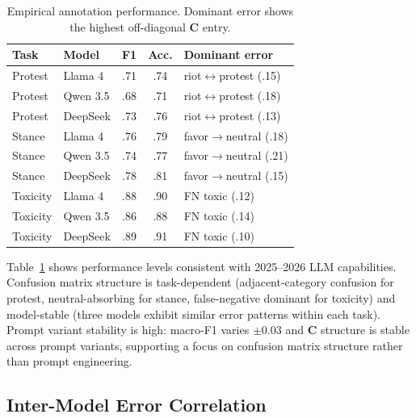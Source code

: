 \documentclass[11pt,letterpaper]{article}
\begin{document}
\begin{table}[t]
\centering
\small
\caption{Empirical annotation performance. Dominant error shows the highest off-diagonal $\mathbf{C}$ entry.}
\label{tab:empirical_performance}
\begin{tabular}{@{}llccl@{}}
\toprule
\textbf{Task} & \textbf{Model} & \textbf{F1} & \textbf{Acc.} & \textbf{Dominant error} \\
\midrule
Protest & Llama 4 & .71 & .74 & riot$\leftrightarrow$protest (.15) \\
Protest & Qwen 3.5 & .68 & .71 & riot$\leftrightarrow$protest (.18) \\
Protest & DeepSeek & .73 & .76 & riot$\leftrightarrow$protest (.13) \\
\midrule
Stance & Llama 4 & .76 & .79 & favor$\to$neutral (.18) \\
Stance & Qwen 3.5 & .74 & .77 & favor$\to$neutral (.21) \\
Stance & DeepSeek & .78 & .81 & favor$\to$neutral (.15) \\
\midrule
Toxicity & Llama 4 & .88 & .90 & FN toxic (.12) \\
Toxicity & Qwen 3.5 & .86 & .88 & FN toxic (.14) \\
Toxicity & DeepSeek & .89 & .91 & FN toxic (.10) \\
\bottomrule
\end{tabular}
\end{table}

Table~\ref{tab:empirical_performance} shows performance levels consistent with 2025--2026 LLM capabilities.
Confusion matrix structure is task-dependent (adjacent-category confusion for protest, neutral-absorbing for stance, false-negative dominant for toxicity) and model-stable (three models exhibit similar error patterns within each task).
Prompt variant stability is high: macro-F1 varies $\pm 0.03$ and $\mathbf{C}$ structure is stable across prompt variants, supporting a focus on confusion matrix structure rather than prompt engineering.

\subsection{Inter-Model Error Correlation}
\end{document}
